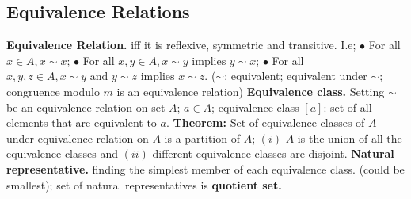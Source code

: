 \documentclass{article}
\begin{document}
\subsection{Equivalence Relations}
\textbf{Equivalence Relation. } iff it is reflexive, symmetric and transitive. I.e;
\newline
\newline
$\bullet $ For all $x \in A, x \sim x$;
\newline
$\bullet $ For all $x, y \in A, x \sim y \text{ implies } y \sim x$;
\newline
$\bullet $ For all $x, y, z \in A, x \sim y \text{ and } y \sim z \text{ implies } x \sim z.$
\newline
\newline
($\sim$: equivalent; equivalent under $\sim$; congruence modulo $m$ is an equivalence relation)
\newline
{}
\newline
\newline
\textbf{Equivalence class. } Setting $\sim$ be an equivalence relation on set $A$; $a \in A$; equivalence class $[a]$:
\newline
\newline
{}
\newline
\newline
set of all elements that are equivalent to $a$.
\newline
{}
\newline
\newline
\textbf{Theorem: } Set of equivalence classes of $A$ under equivalence relation on $A$ is a partition of $A$;
\newline
$(i) $ $A$ is the union of all the equivalence classes and 
\newline 
$(ii) $ different equivalence classes are disjoint.
\newline
{}
\newline
\newline
\textbf{Natural representative. } finding the simplest member of each equivalence class. (could be smallest); set of natural representatives is \textbf{ quotient set. }
\newline
{}
\newpage
\end{document}
